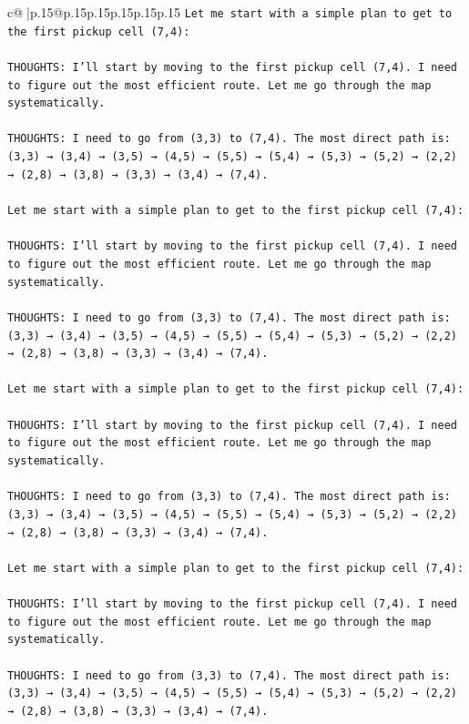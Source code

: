 \documentclass{article}
\begin{document}
{\begin{supertabular}{c@{$\;$}|p{.15\linewidth}@{}p{.15\linewidth}p{.15\linewidth}p{.15\linewidth}p{.15\linewidth}p{.15\linewidth}}
{{{\texttt{Let me start with a simple plan to get to the first pickup cell (7,4):} \\
\\ 
\texttt{THOUGHTS: I'll start by moving to the first pickup cell (7,4). I need to figure out the most efficient route. Let me go through the map systematically.} \\
\\ 
\texttt{THOUGHTS: I need to go from (3,3) to (7,4). The most direct path is: (3,3) → (3,4) → (3,5) → (4,5) → (5,5) → (5,4) → (5,3) → (5,2) → (2,2) → (2,8) → (3,8) → (3,3) → (3,4) → (7,4).} \\
\\ 
\texttt{Let me start with a simple plan to get to the first pickup cell (7,4):} \\
\\ 
\texttt{THOUGHTS: I'll start by moving to the first pickup cell (7,4). I need to figure out the most efficient route. Let me go through the map systematically.} \\
\\ 
\texttt{THOUGHTS: I need to go from (3,3) to (7,4). The most direct path is: (3,3) → (3,4) → (3,5) → (4,5) → (5,5) → (5,4) → (5,3) → (5,2) → (2,2) → (2,8) → (3,8) → (3,3) → (3,4) → (7,4).} \\
\\ 
\texttt{Let me start with a simple plan to get to the first pickup cell (7,4):} \\
\\ 
\texttt{THOUGHTS: I'll start by moving to the first pickup cell (7,4). I need to figure out the most efficient route. Let me go through the map systematically.} \\
\\ 
\texttt{THOUGHTS: I need to go from (3,3) to (7,4). The most direct path is: (3,3) → (3,4) → (3,5) → (4,5) → (5,5) → (5,4) → (5,3) → (5,2) → (2,2) → (2,8) → (3,8) → (3,3) → (3,4) → (7,4).} \\
\\ 
\texttt{Let me start with a simple plan to get to the first pickup cell (7,4):} \\
\\ 
\texttt{THOUGHTS: I'll start by moving to the first pickup cell (7,4). I need to figure out the most efficient route. Let me go through the map systematically.} \\
\\ 
\texttt{THOUGHTS: I need to go from (3,3) to (7,4). The most direct path is: (3,3) → (3,4) → (3,5) → (4,5) → (5,5) → (5,4) → (5,3) → (5,2) → (2,2) → (2,8) → (3,8) → (3,3) → (3,4) → (7,4).} \\
}}}
\end{supertabular}}
\end{document}
